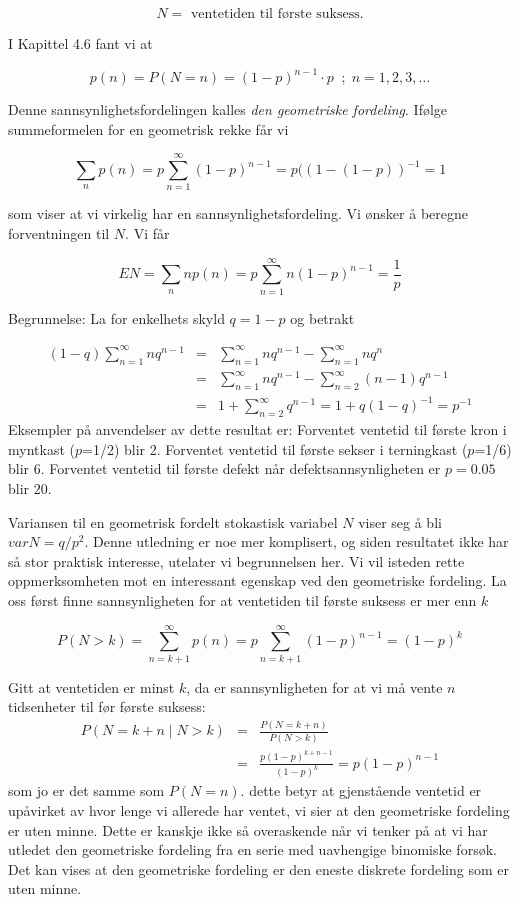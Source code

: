 \[N= \mbox{\ \ ventetiden til første suksess.} \]

\noindent I Kapittel 4.6 fant vi at 

\[ p(n)=P(N=n)={(1-p)}^{n-1} \cdot p \; \; ; \; n=1,2,3,\ldots \]

\noindent Denne sannsynlighetsfordelingen kalles {\em den geometriske
fordeling}. Ifølge summeformelen for en geometrisk rekke får vi

\[ \sum_np(n)=p\sum_{n=1}^{\infty}{(1-p)}^{n-1}=p({(1-(1-p))}^{-1}=1 \]

\noindent som viser at vi virkelig har en sannsynlighetsfordeling. Vi
ønsker å beregne forventningen til $N$. Vi får

\[ EN=\sum_nnp(n)=p\sum_{n=1}^{\infty}n{(1-p)}^{n-1}=\frac{1}{p} \]

\noindent Begrunnelse: La for enkelhets skyld $q=1-p$ og betrakt

\begin{eqnarray*}
 (1-q)\sum_{n=1}^{\infty}nq^{n-1}&=&
                 \sum_{n=1}^{\infty}nq^{n-1} - \sum_{n=1}^{\infty}nq^n \\
 &=&\sum_{n=1}^{\infty}nq^{n-1}-\sum_{n=2}^{\infty}(n-1)q^{n-1}\\
 &=&1+\sum_{n=2}^{\infty}q^{n-1}=1+q{(1-q)}^{-1}=p^{-1}
\end{eqnarray*}
\noindent Eksempler på anvendelser av dette resultat er: Forventet ventetid
til første kron i myntkast ($p$=1/2) blir 2. Forventet
ventetid til første sekser i terningkast ($p$=1/6) blir 6.
Forventet ventetid til første defekt når defektsannsynligheten er
$p=0.05$ blir $20$.

Variansen til en geometrisk fordelt stokastisk variabel $N$ viser
seg å bli $varN=q/p^2$. Denne utledning er noe mer komplisert, og
siden resultatet ikke har så stor praktisk interesse, utelater vi
begrunnelsen her. Vi vil isteden rette oppmerksomheten mot en
interessant egenskap ved den geometriske fordeling.
La oss først finne sannsynligheten for at ventetiden til første
suksess er mer enn $k$

\[ P(N > k)=\sum_{n=k+1}^{\infty}p(n)
            =p\sum_{n=k+1}^{\infty}{(1-p)}^{n-1}={(1-p)}^k \]

\noindent Gitt at ventetiden er minst $k$, da er sannsynligheten for at
vi må vente $n$ tidsenheter til før første suksess:
\begin{eqnarray*}
P(N=k+n \mid N>k)&=&\frac{P(N=k+n)}{P(N>k)} \\
                 &=&\frac{{p(1-p)}^{k+n-1}}{{(1-p)}^k}=p{(1-p)}^{n-1}
\end{eqnarray*}
\noindent som jo er det samme som $P(N=n)$. dette betyr at gjenstående
ventetid er upåvirket av hvor lenge vi allerede har ventet, vi
sier at den geometriske fordeling er uten minne. Dette er kanskje
ikke så overaskende når vi tenker på at vi har utledet den
geometriske fordeling fra en serie med uavhengige binomiske
forsøk. Det kan vises at den geometriske fordeling er den eneste
diskrete fordeling som er uten minne.
\normalsize


